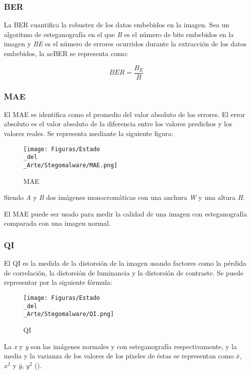 \subsubsection{BER}

La \ac{BER} cuantifica la robustez de los datos embebidos en la imagen. Sea un algoritmo de esteganografía en el que \textit{B} es el número de bits embebidos en la imagen y \textit{BE} es el número de errores ocurridos durante la extracción de los datos embebidos, la ac{BER} se representa como:

\begin{equation}
BER = \frac{B_E}{B}
\end{equation}

\subsubsection{MAE}

El \ac{MAE} se identifica como el promedio del valor absoluto de los errores. El error absoluto es el valor absoluto de la diferencia entre los valores predichos y los valores reales. Se representa mediante la siguiente figura:

\begin{figure}[H]
  \centering
  \texttt{[image: Figuras/Estado\\\_del\\\_Arte/Stegomalware/MAE.png]}
  \label{fig:MAE}
  \caption{MAE}
\end{figure}

Siendo \textit{A} y \textit{B} dos imágenes monocromáticas con una anchura \textit{W} y una altura \textit{H}.

El \ac{MAE} puede ser usado para medir la calidad de una imagen con esteganografía comparada con una imagen normal.

\subsubsection{QI}

El \ac{QI} es la medida de la distorsión de la imagen usando factores como la pérdida de correlación, la distorsión de luminancia y la distorsión de contraste. Se puede representar por la siguiente fórmula:

\begin{figure}[H]
  \centering
  \texttt{[image: Figuras/Estado\\\_del\\\_Arte/Stegomalware/QI.png]}
  \label{fig:QI}
  \caption{QI}
\end{figure}

La \textit{x} y \textit{y} son las imágenes normales y con esteganografía respectivamente, y la media y la varianza de los valores de los píxeles de éstas se representan como \textit{$\bar{x}$}, \textit{$x^{2}$} y \textit{$\bar{y}$}, \textit{$y^{2}$} (\cite{qi}).%

